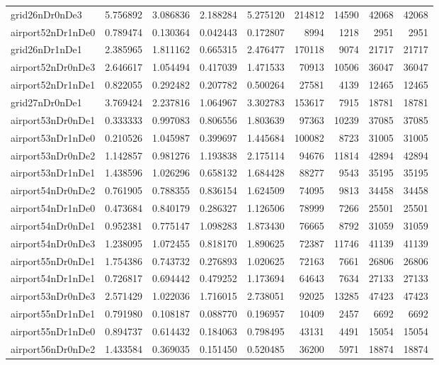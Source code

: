 \begin{longtable}{|l|r|r|r|r|r|r|r|r|}
grid26nDr0nDe3 & 5.756892 & 3.086836 & 2.188284 & 5.275120 & 214812 & 14590 & 42068 & 42068 \\
airport52nDr1nDe0 & 0.789474 & 0.130364 & 0.042443 & 0.172807 & 8994 & 1218 & 2951 & 2951 \\
grid26nDr1nDe1 & 2.385965 & 1.811162 & 0.665315 & 2.476477 & 170118 & 9074 & 21717 & 21717 \\
airport52nDr0nDe3 & 2.646617 & 1.054494 & 0.417039 & 1.471533 & 70913 & 10506 & 36047 & 36047 \\
airport52nDr1nDe1 & 0.822055 & 0.292482 & 0.207782 & 0.500264 & 27581 & 4139 & 12465 & 12465 \\
grid27nDr0nDe1 & 3.769424 & 2.237816 & 1.064967 & 3.302783 & 153617 & 7915 & 18781 & 18781 \\
airport53nDr0nDe1 & 0.333333 & 0.997083 & 0.806556 & 1.803639 & 97363 & 10239 & 37085 & 37085 \\
airport53nDr1nDe0 & 0.210526 & 1.045987 & 0.399697 & 1.445684 & 100082 & 8723 & 31005 & 31005 \\
airport53nDr0nDe2 & 1.142857 & 0.981276 & 1.193838 & 2.175114 & 94676 & 11814 & 42894 & 42894 \\
airport53nDr1nDe1 & 1.438596 & 1.026296 & 0.658132 & 1.684428 & 88277 & 9543 & 35195 & 35195 \\
airport54nDr0nDe2 & 0.761905 & 0.788355 & 0.836154 & 1.624509 & 74095 & 9813 & 34458 & 34458 \\
airport54nDr1nDe0 & 0.473684 & 0.840179 & 0.286327 & 1.126506 & 78999 & 7266 & 25501 & 25501 \\
airport54nDr0nDe1 & 0.952381 & 0.775147 & 1.098283 & 1.873430 & 76665 & 8792 & 31059 & 31059 \\
airport54nDr0nDe3 & 1.238095 & 1.072455 & 0.818170 & 1.890625 & 72387 & 11746 & 41139 & 41139 \\
airport55nDr0nDe1 & 1.754386 & 0.743732 & 0.276893 & 1.020625 & 72163 & 7661 & 26806 & 26806 \\
airport54nDr1nDe1 & 0.726817 & 0.694442 & 0.479252 & 1.173694 & 64643 & 7634 & 27133 & 27133 \\
airport53nDr0nDe3 & 2.571429 & 1.022036 & 1.716015 & 2.738051 & 92025 & 13285 & 47423 & 47423 \\
airport55nDr1nDe1 & 0.791980 & 0.108187 & 0.088770 & 0.196957 & 10409 & 2457 & 6692 & 6692 \\
airport55nDr1nDe0 & 0.894737 & 0.614432 & 0.184063 & 0.798495 & 43131 & 4491 & 15054 & 15054 \\
airport56nDr0nDe2 & 1.433584 & 0.369035 & 0.151450 & 0.520485 & 36200 & 5971 & 18874 & 18874 \\

\end{longtable}
